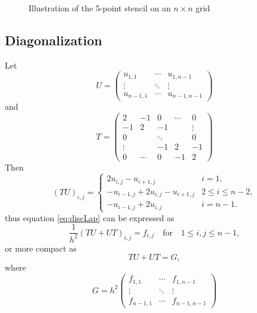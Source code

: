 \documentclass[11pt,a4paper,english]{article}
\numberwithin{figure}{subsection}
\numberwithin{table}{subsection}
\begin{document}
\begin{figure}[h]
\centering
{}
\label{fig:grid}
\caption{Illustration of the 5-point stencil on an $n\times n$ grid}
\end{figure}

\subsection{Diagonalization}
Let 
\begin{equation}
	U = \begin{pmatrix}
	u_{1,1} & \cdots & u_{1,n-1} \\
	\vdots & \ddots& \vdots \\
	u_{n-1,1} & \cdots & u_{n-1,n-1}
	\end{pmatrix}
\end{equation}
and
\begin{equation}
	\label{eq:Tmatrix}
	T = \begin{pmatrix}
	2		&	-1		&	0		&	\cdots	&	0		\\
	-1		&	2		&	-1		&			&	\vdots	\\
	0		&			&	\ddots	&			&	0		\\
	\vdots	&			&		-1	&	2		&	-1		\\
	0		&	\cdots	&	0		&	-1		&	2	
	\end{pmatrix}
\end{equation}
Then
\begin{equation}
	(TU)_{i,j} = \begin{cases}  2u_{i,j} - u_{i+1,j} & i = 1, \\
	-u_{i-1,j} + 2u_{i,j} - u_{i+1,j}  & 2 \leq i \leq n-2, \\
	-u_{i-1,j} + 2u_{i,j}  & i = n-1.
	\end{cases}
\end{equation}
thus equation \eqref{eq:discLap} can be expressed as
\[
	\frac{1}{h^2}(TU+UT)_{i,j} = f_{i,j} \quad \text{for} \quad 1\leq i,j \leq n-1,
\]
or more compact as
\begin{equation}
	\label{eq:TUUTG}
	TU+UT = G,
\end{equation}
where
\begin{equation*}
	G = h^2\begin{pmatrix}
	f_{1,1} 	& \cdots	& f_{1,n-1} \\
	\vdots		& \ddots	& \vdots \\
	f_{n-1,1}	& \cdots	& f_{n-1,n-1}
	\end{pmatrix}
\end{equation*}
\end{document}
